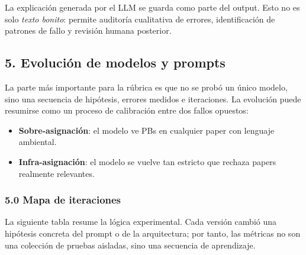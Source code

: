 La explicación generada por el LLM se guarda como parte del output. Esto no es solo \emph{texto bonito}: permite auditoría cualitativa de errores, identificación de patrones de fallo y revisión humana posterior.

\subsection{5. Evolución de modelos y prompts}

La parte más importante para la rúbrica es que no se probó un único modelo, sino una secuencia de hipótesis, errores medidos e iteraciones. La evolución puede resumirse como un proceso de calibración entre dos fallos opuestos:

\begin{itemize}
\item \textbf{Sobre-asignación}: el modelo ve PBs en cualquier paper con lenguaje ambiental.
\item \textbf{Infra-asignación}: el modelo se vuelve tan estricto que rechaza papers realmente relevantes.
\end{itemize}

\subsubsection{5.0 Mapa de iteraciones}

La siguiente tabla resume la lógica experimental. Cada versión cambió una hipótesis concreta del prompt o de la arquitectura; por tanto, las métricas no son una colección de pruebas aisladas, sino una secuencia de aprendizaje.

